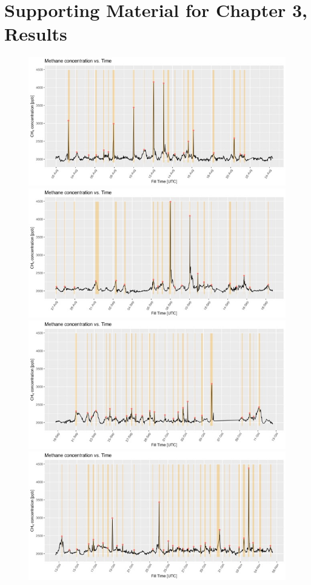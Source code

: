 \chapter{Supporting Material for Chapter 3, Results}
\label{cha:app3}
\begin{figure}
\centering
    \includegraphics[width=.8\textwidth]{figures/Appendix/CH4_Timelines/MediumPeakTimeline/4_CH4_Timeline0_Medium_Peaks Medium.jpeg}
    \\[\smallskipamount]
    \includegraphics[width=.8\textwidth]{figures/Appendix/CH4_Timelines/MediumPeakTimeline/4_CH4_Timeline1_Medium_Peaks Medium.jpeg}
    \\[\smallskipamount]
    \includegraphics[width=.8\textwidth]{figures/Appendix/CH4_Timelines/MediumPeakTimeline/4_CH4_Timeline2_Medium_Peaks Medium.jpeg}
    \includegraphics[width=.8\textwidth]{figures/Appendix/CH4_Timelines/MediumPeakTimeline/4_CH4_Timeline3_Medium_Peaks Medium.jpeg}
\end{figure}
